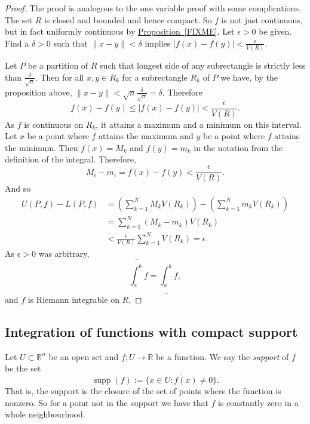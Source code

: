 \documentclass[12pt]{book}
\newcommand{\snorm}[1]{\lVert {#1} \rVert}
\newcommand{\abs}[1]{\left\lvert {#1} \right\rvert}
\newcommand{\R}{{\mathbb{R}}}
\newcommand{\myindex}[1]{#1\index{#1}}
\theoremstyle{plain}
\theoremstyle{remark}
\theoremstyle{definition}
\theoremstyle{exercise}
\theoremstyle{example}
\newcommand{\propref}[1]{\hyperref[#1]{Proposition~\ref*{#1}}}
\begin{document}
\begin{proof}
The proof is analogous to the one variable proof with some complications.
The set $R$ is closed and bounded and hence compact.  So
$f$ is not just continuous, but in fact uniformly continuous 
by \propref{FIXME}.
Let $\epsilon > 0$ be given.  Find a $\delta > 0$ such that
$\snorm{x-y} < \delta$ implies $\abs{f(x)-f(y)} < \frac{\epsilon}{V(R)}$.

Let $P$ be a partition of $R$ such that longest side of any subrectangle
is strictly less than $\frac{\delta}{\sqrt{n}}$.
Then for all $x, y \in R_k$ for a subrectangle $R_k$ of $P$ we have,
by the proposition above,
$\snorm{x-y} < \sqrt{n} \frac{\delta}{\sqrt{n}} = \delta$.  Therefore
\begin{equation*}
f(x)-f(y) \leq \abs{f(x)-f(y)} < \frac{\epsilon}{V(R)} .
\end{equation*}
As $f$ is continuous on $R_k$, it attains a maximum and a minimum
on this interval.
Let $x$ be a point where $f$ attains the maximum and $y$ be a point
where $f$ attains the minimum.  Then $f(x) = M_k$
and $f(y) = m_k$ in the notation from the definition of the integral.
Therefore,
\begin{equation*}
M_i-m_i = f(x)-f(y) < 
\frac{\epsilon}{V(R)} .
\end{equation*}
And so
\begin{equation*}
\begin{split}
U(P,f) - L(P,f)
& =
\left(
\sum_{k=1}^N
M_k V(R_k)
\right)
-
\left(
\sum_{k=1}^N
m_k V(R_k)
\right)
\\
& =
\sum_{k=1}^N
(M_k-m_k) V(R_k)
\\
& <
\frac{\epsilon}{V(R)}
\sum_{k=1}^N
V(R_k)
= \epsilon.
\end{split}
\end{equation*}
As $\epsilon > 0$ was arbitrary,
\begin{equation*}
\overline{\int_a^b} f = \underline{\int_a^b} f ,
\end{equation*}
and $f$ is Riemann integrable on $R$.
\end{proof}

\subsection{Integration of functions with compact support}

Let $U \subset \R^n$ be an open set and
$f \colon U \to \R$ be a function.  We say the
\emph{\myindex{support}} of $f$ be the set
\begin{equation*}
\operatorname{supp} (f) :=
\overline{
\{ x \in U : f(x) \not= 0 \}
} .
\end{equation*}
That is, the support is the closure of the set of points where the
function is nonzero.  So for a point not in the support we have that
$f$ is constantly zero in a whole neighbourhood.
\end{document}
